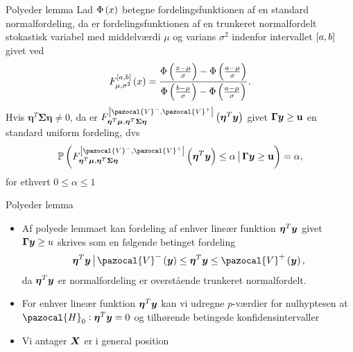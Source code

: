 \begin{frame}{Polyeder lemma}
Lad \(\Phi \del{x}\) betegne fordelingsfunktionen af en standard normalfordeling, da er fordelingsfunktionen af en trunkeret normalfordelt stokastisk variabel med middelværdi \(\mu\) og varians \(\sigma^2\) indenfor intervallet \(\sbr{a,b}\) givet ved
\begin{align*}
F_{\mu, \sigma^2}^{\sbr{a,b}} \del{x} = \frac{\Phi\del{\frac{x-\mu}{\sigma}} - \Phi\del{\frac{a-\mu}{\sigma}}}{\Phi\del{\frac{b-\mu}{\sigma}} - \Phi\del{\frac{a-\mu}{\sigma}}}.
\end{align*}
Hvis \(\boldsymbol{\eta}^T \boldsymbol{\Sigma} \boldsymbol{\eta} \neq 0\), da er \(F_{\boldsymbol{\eta}^T \vmu, \boldsymbol{\eta}^T \boldsymbol{\Sigma} \boldsymbol{\eta}}^{\sbr{\pazocal{V}^-,\pazocal{V}^+}} \del{\boldsymbol{\eta}^T \vy} \) givet \(\boldsymbol{\Gamma} \bm{y} \geq \mathbf{u}\) en standard uniform fordeling, dvs
\begin{align*}
\mathbb{P} \del{F_{\boldsymbol{\eta}^T \vmu, \boldsymbol{\eta}^T \boldsymbol{\Sigma} \boldsymbol{\eta}}^{\sbr{\pazocal{V}^-,\pazocal{V}^+}} \del{\boldsymbol{\eta}^T \vy} \leq \alpha \given \boldsymbol{\Gamma} \vy \geq \mathbf{u}} = \alpha, 
\end{align*}
for ethvert \(0 \leq \alpha \leq 1\)
\end{frame}

\begin{frame}{Polyeder lemma}
\begin{itemize}
\item Af polyede lemmaet kan fordeling af enhver lineær funktion $\boldsymbol \eta^T \bm{y}$ givet $\boldsymbol \Gamma \bm{y} \geq u$ skrives som en følgende betinget fordeling
\begin{align*}
\boldsymbol \eta^T \vy \given \pazocal{V}^- \del{\vy} \leq \boldsymbol \eta^T \vy \leq \pazocal{V}^+ \del{\vy}, 
\end{align*}
da $\boldsymbol \eta^T \bm{y} $ er normalfordeling er overstående trunkeret normalfordelt. 
\item For enhver lineær funktion $\boldsymbol \eta^T \bm{y} $ kan vi udregne $p$-værdier for nulhyptesen at $\pazocal{H}_0:\boldsymbol \eta^T \vy   = 0$ og tilhørende betingede konfidensintervaller
\item Vi antager $\bm{X}$ er i general position
\end{itemize}
\end{frame}

